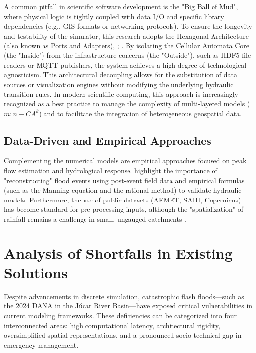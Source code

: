A common pitfall in scientific software development is the "Big Ball of Mud", where physical logic is tightly coupled with data I/O and 
specific library dependencies (e.g., GIS formats or networking protocols). To ensure the longevity and testability of the simulator, 
this research adopts the Hexagonal Architecture (also known as Ports and Adapters), \cite{Cockburn2005}; \cite{Nunkesser2022}. By isolating the Cellular Automata Core 
(the "Inside") from the infrastructure concerns (the "Outside"), such as HDF5 file readers or MQTT publishers, the system achieves a 
high degree of technological agnosticism. This architectural decoupling allows for the substitution of data sources or visualization 
engines without modifying the underlying hydraulic transition rules. In modern scientific computing, this approach is increasingly 
recognized as a best practice to manage the complexity of multi-layered models ($m:n-CA^k$) and to facilitate the integration of 
heterogeneous geospatial data.


\subsection{Data-Driven and Empirical Approaches}

Complementing the numerical models are empirical approaches focused on peak flow estimation and hydrological response. 
\cite{Muoz2025} highlight the importance of "reconstructing" flood events using post-event field data and empirical 
formulas (such as the Manning equation and the rational method) to validate hydraulic models. Furthermore, the use of 
public datasets (AEMET, SAIH, Copernicus) has become standard for pre-processing inputs, although the "spatialization" 
of rainfall remains a challenge in small, ungauged catchments \parencite{Vasileva2021}.


\section{Analysis of Shortfalls in Existing Solutions}

Despite advancements in discrete simulation, catastrophic flash floods—such as the 2024 DANA in the Júcar River Basin—have exposed critical 
vulnerabilities in current modeling frameworks. These deficiencies can be categorized into four interconnected areas: high computational 
latency, architectural rigidity, oversimplified spatial representations, and a pronounced socio-technical gap in emergency management.

